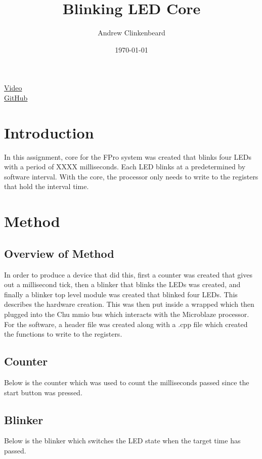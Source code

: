 \documentclass[12pt]{article}
\title{Blinking LED Core}
\author{Andrew Clinkenbeard}
\date{\today}
\newcommand{\Verilog}[2][]{%
	
}
\begin{document}
\maketitle
\href {https://www.youtube.com/watch?v=ml-7Efxw5FM} {Video}\\
\href {https://github.com/andrew-clinkenbeard/Reaction-Timer} {GitHub}
\section{Introduction}

In this assignment, core for the FPro system was created that blinks four LEDs with a period of XXXX milliseconds. Each LED blinks at a predetermined by software interval. With the core, the processor only needs to write to the registers that hold the interval time. 





\section{Method}
\subsection{Overview of Method}
In order to produce a device that did this, first a counter was created that gives out a millisecond tick, then a blinker that blinks the LEDs was created, and finally a blinker top level module was created that blinked four LEDs. This describes the hardware creation. This was then put inside a wrapped which then plugged into the Chu mmio bus which interacts with the Microblaze processor. For the software, a header file was created along with a .cpp file which created the functions to write to the registers.

\subsection{Counter}
Below is the counter which was used to count the milliseconds passed since the start button was pressed.
\Verilog[firstline=4]{./counter.sv}
\subsection{Blinker}
Below is the blinker which switches the LED state when the target time has passed.
\Verilog[firstline=4]{./blinker.sv}
\end{document}
